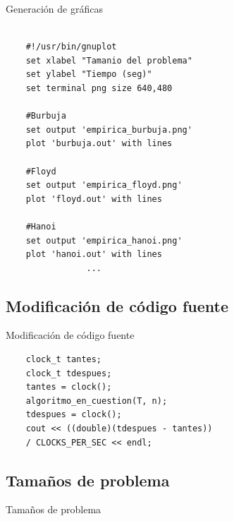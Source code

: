 \documentclass{beamer}
\begin{document}
\begin{frame}[fragile]{Generación de gráficas}

\begin{verbatim}

	#!/usr/bin/gnuplot
	set xlabel "Tamanio del problema"
	set ylabel "Tiempo (seg)"
	set terminal png size 640,480
	
	#Burbuja
	set output 'empirica_burbuja.png'
	plot 'burbuja.out' with lines

	#Floyd
	set output 'empirica_floyd.png'
	plot 'floyd.out' with lines

	#Hanoi
	set output 'empirica_hanoi.png'
	plot 'hanoi.out' with lines
				...
\end{verbatim}
\end{frame}

\subsection{Modificación de código fuente}

\begin{frame}[fragile]{Modificación de código fuente}
\begin{verbatim}
	clock_t tantes;
	clock_t tdespues;
	tantes = clock();
	algoritmo_en_cuestion(T, n);
	tdespues = clock();
	cout << ((double)(tdespues - tantes))
	/ CLOCKS_PER_SEC << endl;
\end{verbatim}
\end{frame}


\subsection{Tamaños de problema}
\begin{frame}[fragile]{Tamaños de problema}
\begin{table}[H]
\centering
{}
\end{table}
\end{frame}
\end{document}
